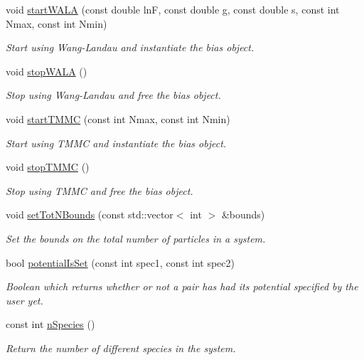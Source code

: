 \begin{DoxyCompactItemize}
void \hyperlink{classsim_system_a0abac060c326c4d82952737e55814351}{start\+W\+A\+L\+A} (const double ln\+F, const double g, const double s, const int Nmax, const int Nmin)
\begin{DoxyCompactList}\small\item\em Start using Wang-\/\+Landau and instantiate the bias object. \end{DoxyCompactList}\item 
void \hyperlink{classsim_system_ad6febde00f19ae0787771f2d1d9e391b}{stop\+W\+A\+L\+A} ()
\begin{DoxyCompactList}\small\item\em Stop using Wang-\/\+Landau and free the bias object. \end{DoxyCompactList}\item 
void \hyperlink{classsim_system_a0d910b833afccdd57e86cc45787e43a1}{start\+T\+M\+M\+C} (const int Nmax, const int Nmin)
\begin{DoxyCompactList}\small\item\em Start using T\+M\+M\+C and instantiate the bias object. \end{DoxyCompactList}\item 
void \hyperlink{classsim_system_a69edcc2c27db3d4e94002ac5635e9030}{stop\+T\+M\+M\+C} ()
\begin{DoxyCompactList}\small\item\em Stop using T\+M\+M\+C and free the bias object. \end{DoxyCompactList}\item 
void \hyperlink{classsim_system_a76b5dc3e179e275e40726c660d8e669b}{set\+Tot\+N\+Bounds} (const std\+::vector$<$ int $>$ \&bounds)
\begin{DoxyCompactList}\small\item\em Set the bounds on the total number of particles in a system. \end{DoxyCompactList}\item 
bool \hyperlink{classsim_system_a40af191fae6091e26413ee06ae188ae9}{potential\+Is\+Set} (const int spec1, const int spec2)
\begin{DoxyCompactList}\small\item\em Boolean which returns whether or not a pair has had its potential specified by the user yet. \end{DoxyCompactList}\item 
const int \hyperlink{classsim_system_ab5e2e9b6204de15520302fe1d51688dd}{n\+Species} ()
\begin{DoxyCompactList}\small\item\em Return the number of different species in the system. \end{DoxyCompactList}\item 

\end{DoxyCompactItemize}
